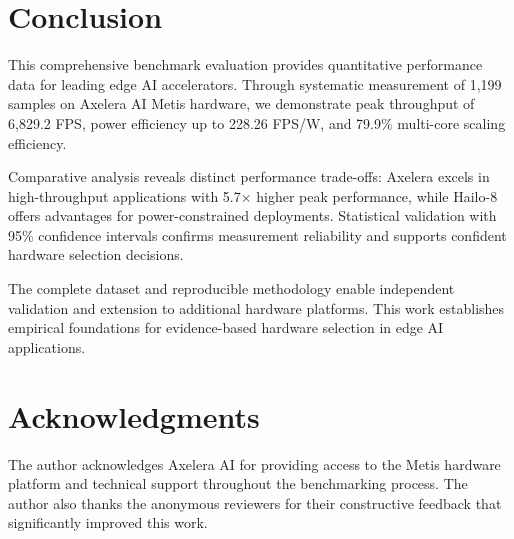 \documentclass[12pt,draftcls,onecolumn]{IEEEtran}
\begin{document}
\section{Conclusion}

This comprehensive benchmark evaluation provides quantitative performance data for leading edge AI accelerators. Through systematic measurement of 1,199 samples on Axelera AI Metis hardware, we demonstrate peak throughput of 6,829.2 FPS, power efficiency up to 228.26 FPS/W, and 79.9\% multi-core scaling efficiency.

Comparative analysis reveals distinct performance trade-offs: Axelera excels in high-throughput applications with 5.7× higher peak performance, while Hailo-8 offers advantages for power-constrained deployments. Statistical validation with 95\% confidence intervals confirms measurement reliability and supports confident hardware selection decisions.

The complete dataset and reproducible methodology enable independent validation and extension to additional hardware platforms. This work establishes empirical foundations for evidence-based hardware selection in edge AI applications.

\section*{Acknowledgments}

The author acknowledges Axelera AI for providing access to the Metis hardware platform and technical support throughout the benchmarking process. The author also thanks the anonymous reviewers for their constructive feedback that significantly improved this work.



\end{document}
